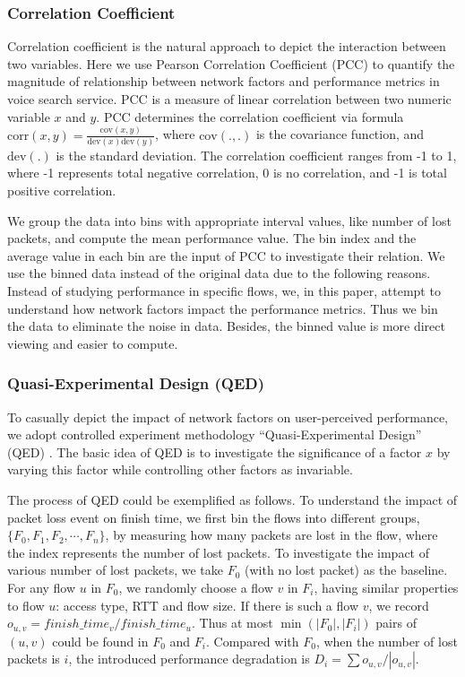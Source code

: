 \subsubsection{Correlation Coefficient}

Correlation coefficient is the natural approach to depict the interaction between two variables. Here we use Pearson Correlation Coefficient (PCC) to quantify the magnitude of relationship between network factors and performance metrics in voice search service. PCC is a measure of linear correlation between two numeric variable $x$ and $y$. PCC determines the correlation coefficient via formula $\text{corr}(x,y) = \frac{\text{cov}(x,y)}{\text{dev}(x) \text{dev}(y)}$, where $\text{cov}(.,.)$ is the covariance function, and $\text{dev}(.)$ is the standard deviation. The correlation coefficient ranges from -1 to 1, where -1 represents total negative correlation, 0 is no correlation, and -1 is total positive correlation.

We group the data into bins with appropriate interval values, like number of lost packets, and compute the mean performance value. The bin index and the average value in each bin are the input of PCC to investigate their relation. We use the binned data instead of the original data due to the following reasons. Instead of studying performance in specific flows, we, in this paper, attempt to understand how network factors impact the performance metrics. Thus we bin the data to eliminate the noise in data. Besides, the binned value is more direct viewing and easier to compute.

\subsubsection{Quasi-Experimental Design (QED)}

To casually depict the impact of network factors on user-perceived performance, we adopt controlled experiment methodology ``Quasi-Experimental Design'' (QED) \cite{krishnan2013video}. The basic idea of QED is to investigate the significance of a factor $x$ by varying this factor while controlling other factors as invariable.

The process of QED could be exemplified as follows. To understand the impact of packet loss event on finish time, we first bin the flows into different groups, $\{ F_0, F_1, F_2, \cdots, F_n \}$, by measuring how many packets are lost in the flow, where the index represents the number of lost packets. To investigate the impact of various number of lost packets, we take $F_0$ (\ie with no lost packet) as the baseline. For any flow $u$ in $F_0$, we randomly choose a flow $v$ in $F_i$, having similar properties to flow $u$: access type, RTT and flow size. If there is such a flow $v$, we record $o_{u,v} = finish\_time_{v} / finish\_time_{u}$. Thus at most $\min(|F_0|, |F_i|)$ pairs of $(u,v)$ could be found in $F_0$ and $F_i$. Compared with $F_0$, when the number of lost packets is $i$, the introduced performance degradation is $D_{i} = \sum o_{u,v} / |o_{u,v}|$.